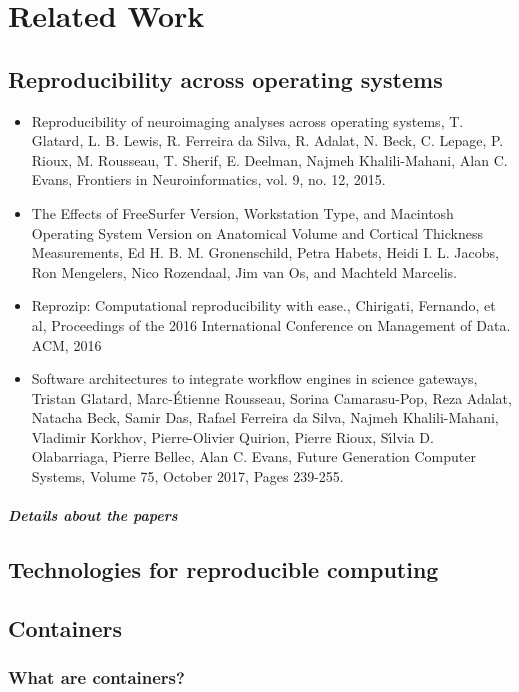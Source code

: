 \chapter{Related Work}

\section{Reproducibility across operating systems}
\begin{itemize}
 \item {Reproducibility of neuroimaging analyses across operating systems, T. Glatard, L. B. Lewis, R. Ferreira da Silva, R. Adalat, N. Beck, C. Lepage, P. Rioux, M. Rousseau, T. Sherif, E. Deelman, Najmeh Khalili-Mahani, Alan C. Evans, Frontiers in Neuroinformatics, vol. 9, no. 12, 2015.}
 \item {The Effects of FreeSurfer Version, Workstation Type, and Macintosh Operating System Version on Anatomical Volume and Cortical Thickness Measurements, Ed H. B. M. Gronenschild, Petra Habets, Heidi I. L. Jacobs, Ron Mengelers, Nico Rozendaal, Jim van Os, and Machteld Marcelis.}
 \item {Reprozip: Computational reproducibility with ease., Chirigati, Fernando, et al, Proceedings of the 2016 International Conference on Management of Data. ACM, 2016}
 \item {Software architectures to integrate workflow engines in science gateways, Tristan Glatard, Marc-Étienne Rousseau, Sorina Camarasu-Pop, Reza Adalat, Natacha Beck, Samir Das, Rafael Ferreira da Silva, Najmeh Khalili-Mahani, Vladimir Korkhov, Pierre-Olivier Quirion, Pierre Rioux, Sı́lvia D. Olabarriaga, Pierre Bellec, Alan C. Evans, Future Generation Computer Systems, Volume 75, October 2017, Pages 239-255.}
\end{itemize}
\paragraph{Details about the papers}

\section{Technologies for reproducible computing}
\section{Containers}
\subsection{What are containers?}
